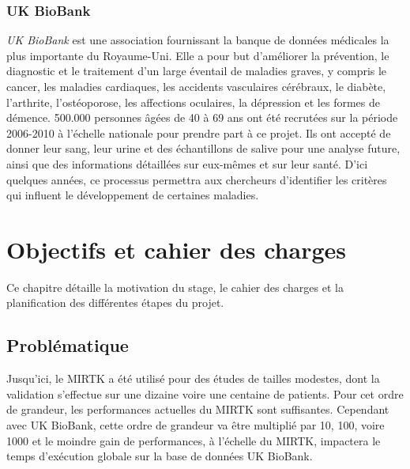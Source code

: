 \documentclass[10pt]{report}
\begin{document}
	 \subsection{UK BioBank}

	 \textit{UK BioBank} est une association fournissant la banque de données médicales la plus importante du Royaume-Uni. Elle a pour but d'améliorer la prévention, le diagnostic et le traitement d'un large éventail de maladies graves, y compris le cancer, les maladies cardiaques, les accidents vasculaires cérébraux, le diabète, l'arthrite, l'ostéoporose, les affections oculaires, la dépression et les formes de démence. 500.000 personnes âgées de 40 à 69 ans ont été recrutées sur la période 2006-2010 à l'échelle nationale pour prendre part à ce projet. Ils ont accepté de donner leur sang, leur urine et des échantillons de salive pour une analyse future, ainsi que des informations détaillées sur eux-mêmes et sur leur santé. D'ici quelques années, ce processus permettra aux chercheurs d'identifier les critères qui influent le développement de certaines maladies.
	 	 
\chapter{Objectifs et cahier des charges}
	Ce chapitre détaille la motivation du stage, le cahier des charges et la planification des différentes étapes du projet.
	\section{Problématique} 
	Jusqu'ici, le MIRTK a été utilisé pour des études de tailles modestes, dont la validation s'effectue sur une dizaine voire une centaine de patients. Pour cet ordre de grandeur, les performances actuelles du MIRTK sont suffisantes. Cependant avec UK BioBank, cette ordre de grandeur va être multiplié par 10, 100, voire 1000 et le moindre gain de performances, à l'échelle du MIRTK, impactera le temps d'exécution globale sur la base de données UK BioBank.\\ ~\par
	
\end{document}
